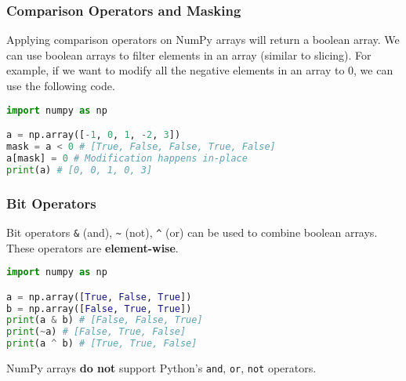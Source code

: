 \documentclass[beamer, en, version=2.0]{huangfusl-template}
\begin{document}
    \begin{frame}[fragile]
        \frametitle{Comparison Operators and Masking}

        Applying comparison operators on NumPy arrays will return a boolean array. We can use boolean arrays to filter elements in an array (similar to slicing). For example, if we want to modify all the negative elements in an array to 0, we can use the following code.

\begin{lstlisting}[language=python]
import numpy as np

a = np.array([-1, 0, 1, -2, 3])
mask = a < 0 # [True, False, False, True, False]
a[mask] = 0 # Modification happens in-place
print(a) # [0, 0, 1, 0, 3]
\end{lstlisting}
    \end{frame}
    \begin{frame}[fragile]
        \frametitle{Bit Operators}

        Bit operators {\color{blue}\footnotesize\verb|&|} (and), {\color{blue}\footnotesize\verb|~|} (not), {\color{blue}\footnotesize\verb|^|} (or) can be used to combine boolean arrays. These operators are \textbf{element-wise}.

\begin{lstlisting}[language=python]
import numpy as np

a = np.array([True, False, True])
b = np.array([False, True, True])
print(a & b) # [False, False, True]
print(~a) # [False, True, False]
print(a ^ b) # [True, True, False]
\end{lstlisting}

        NumPy arrays \textbf{do not} support Python's {\color{blue}\footnotesize\verb|and|}, {\color{blue}\footnotesize\verb|or|}, {\color{blue}\footnotesize\verb|not|} operators.
    \end{frame}
\end{document}

